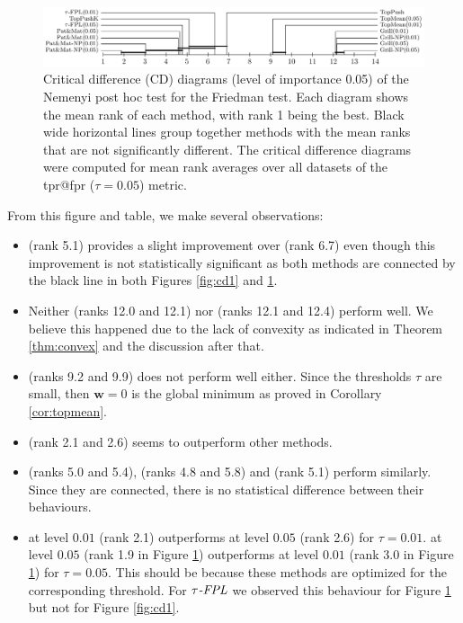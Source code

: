 \begin{figure}[!ht]
  \centering
  \includegraphics[width = \linewidth]{images/crit_diag_fpr_5.pdf}
  \caption{Critical difference (CD) diagrams (level of importance 0.05) of the Nemenyi post hoc test for the Friedman test. Each diagram shows the mean rank of each method, with rank 1 being the best. Black wide horizontal lines group together methods with the mean ranks that are not significantly different. The critical difference diagrams were computed for mean rank averages over all datasets of the tpr@fpr ($\tau=0.05$) metric.}
  \label{fig:cd2}
\end{figure}

From this figure and table, we make several observations:
\begin{itemize}
  \item \TopPushK (rank 5.1) provides a slight improvement over \TopPush (rank 6.7) even though this improvement is not statistically significant as both methods are connected by the black line in both Figures \ref{fig:cd1} and \ref{fig:cd2}.
  \item Neither \Grill (ranks 12.0 and 12.1) nor \GrillNP (ranks 12.1 and 12.4) perform well. We believe this happened due to the lack of convexity as indicated in Theorem \ref{thm:convex} and the discussion after that.
  \item \TopMeanK (ranks 9.2 and 9.9) does not perform well either. Since the thresholds $\tau$ are small, then $\bm{w}=0$ is the global minimum as proved in Corollary \ref{cor:topmean}.
  \item \PatMatNP (rank 2.1 and 2.6) seems to outperform other methods.
  \item \PatMat (ranks 5.0 and 5.4), \tauFPL (ranks 4.8 and 5.8) and \TopPushK (rank 5.1) perform similarly. Since they are connected, there is no statistical difference between their behaviours.
  \item \PatMatNP at level $0.01$ (rank 2.1) outperforms \PatMatNP at level $0.05$ (rank 2.6) for $\tau=0.01$. \PatMatNP at level $0.05$ (rank 1.9 in Figure \ref{fig:cd2}) outperforms \PatMatNP at level $0.01$ (rank 3.0 in Figure \ref{fig:cd2}) for $\tau=0.05$. This should be because these methods are optimized for the corresponding threshold. For ${\emph{$\tau$-FPL}}$ we observed this behaviour for Figure \ref{fig:cd2} but not for Figure \ref{fig:cd1}.
\end{itemize}

